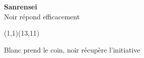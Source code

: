 \documentclass[preview, border=0pt, varwidth=false]{standalone}
\begin{document}
	\setgounit{0.6cm} 
	
\parbox[c][14.65cm][c]{10.2cm}{
	\centering
	
	{\Large\textbf{Sanrensei} \\ Noir répond efficacement}
	\vspace{3em}
	
	\begin{psgopartialboard}{(1,1)(13,11)}
		\pass
	\end{psgopartialboard}
	
	\vspace{1em}
	Blanc prend le coin, noir récupère l'initiative
}
\end{document}

